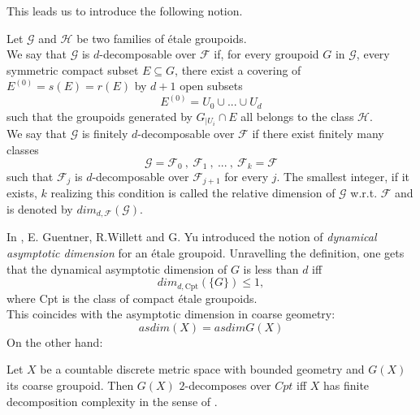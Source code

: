 This leads us to introduce the following notion.

\begin{definition}
Let $\mathcal G$ and $\mathcal H$ be two families of \'etale groupoids. \\

We say that $\mathcal G$ is $d$-decomposable over $\mathcal F$ if, for every groupoid $G$ in $\mathcal G$, every symmetric compact subset $E\subseteq G$, there exist a covering of $E^{(0)} = s(E)=r(E)$ by $d+1$ open subsets 
\[E^{(0)} = U_0 \cup ... \cup U_d \] such that the groupoids generated by $G_{|U_i} \cap E$ all belongs to the class $\mathcal H$.\\

We say that $\mathcal G$ is finitely $d$-decomposable over $\mathcal F$ if there exist finitely many classes 
\[\mathcal G= \mathcal F_0 \ , \ \mathcal F_1 \ , \ ... \ , \ \mathcal F_k = \mathcal F \] 
such that $\mathcal F_j$ is $d$-decomposable over $\mathcal F_{j+1}$ for every $j$. The smallest integer, if it exists, $k$ realizing this condition is called the relative dimension of $\mathcal G$ w.r.t. $\mathcal F$ and is denoted by $dim_{d,\mathcal F}(\mathcal G)$.  
\end{definition}

In \cite{GWY}, E. Guentner, R.Willett and G. Yu introduced the notion of \textit{dynamical asymptotic dimension} for an \'etale groupoid. Unravelling the definition, one gets that the dynamical asymptotic dimension of $G$ is less than $d$ iff \[dim_{d,\text{Cpt}} (\{G\}) \leq 1,\]
where Cpt is the class of compact \'etale groupoids.\\

This coincides with the asymptotic dimension in coarse geometry: \[asdim(X)= asdim G(X)\]
On the other hand: 

\begin{prop}
Let $X$ be a countable discrete metric space with bounded geometry and $G(X)$ its coarse groupoid. Then $G(X)$ $2$-decomposes over $Cpt$ iff $X$ has finite decomposition complexity in the sense of \cite{GuentnerTesseraYu}.
\end{prop}

